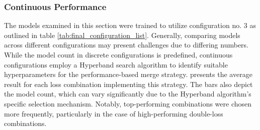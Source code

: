 \subsubsection*{Continuous Performance}
The models examined in this section were trained to utilize configuration no. 3 as outlined in table \ref{tab:final_configuration_list}. Generally, comparing models across different configurations may present challenges due to differing numbers. While the model count in discrete configurations is predefined, continuous configurations employ a Hyperband search algorithm to identify suitable hyperparameters for the performance-based merge strategy.  presents the average result for each loss combination implementing this strategy. The bars also depict the model count, which can vary significantly due to the Hyperband algorithm's specific selection mechanism. Notably, top-performing combinations were chosen more frequently, particularly in the case of high-performing double-loss combinations.

